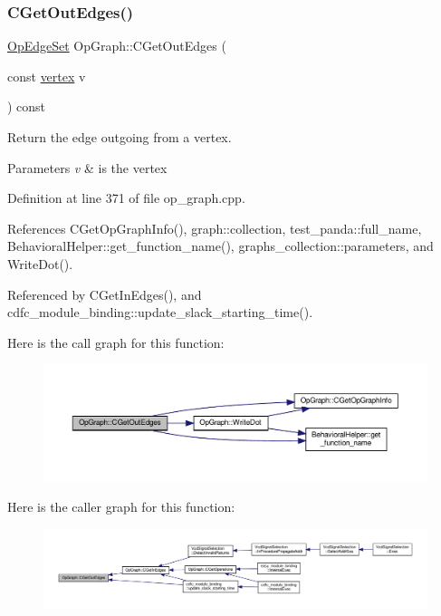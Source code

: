 \subsubsection{\texorpdfstring{C\+Get\+Out\+Edges()}{CGetOutEdges()}}
{\footnotesize\ttfamily \hyperlink{classOpEdgeSet}{Op\+Edge\+Set} Op\+Graph\+::\+C\+Get\+Out\+Edges (\begin{DoxyParamCaption}\item[{const \hyperlink{graph_8hpp_abefdcf0544e601805af44eca032cca14}{vertex}}]{v }\end{DoxyParamCaption}) const}



Return the edge outgoing from a vertex. 


\begin{DoxyParams}{Parameters}
{\em v} & is the vertex \\
\hline
\end{DoxyParams}


Definition at line 371 of file op\+\_\+graph.\+cpp.



References C\+Get\+Op\+Graph\+Info(), graph\+::collection, test\+\_\+panda\+::full\+\_\+name, Behavioral\+Helper\+::get\+\_\+function\+\_\+name(), graphs\+\_\+collection\+::parameters, and Write\+Dot().



Referenced by C\+Get\+In\+Edges(), and cdfc\+\_\+module\+\_\+binding\+::update\+\_\+slack\+\_\+starting\+\_\+time().

Here is the call graph for this function\+:
\nopagebreak
\begin{figure}[H]
\begin{center}
\leavevmode
\includegraphics[width=350pt]{d6/d79/structOpGraph_a515cdea7270316a2dcaabecaab6e4994_cgraph}
\end{center}
\end{figure}
Here is the caller graph for this function\+:
\nopagebreak
\begin{figure}[H]
\begin{center}
\leavevmode
\includegraphics[width=350pt]{d6/d79/structOpGraph_a515cdea7270316a2dcaabecaab6e4994_icgraph}
\end{center}
\end{figure}
\mbox{\label{structOpGraph_a5a7760a7fafb5e18e25d1211b157c559}} 
